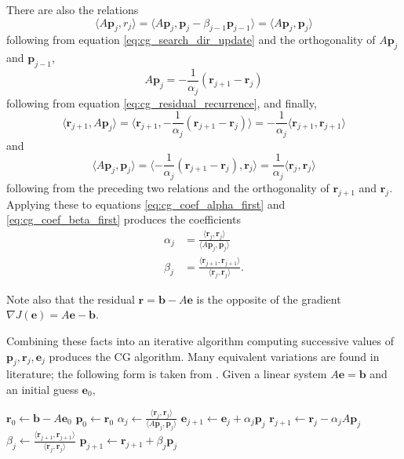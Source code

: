 \documentclass[utf8,english]{gradu3}
\begin{document}
There are also the relations
\[
  \langle A\mathbf{p}_j, r_j \rangle
  = \langle A\mathbf{p}_j, \mathbf{p}_j - \beta_{j-1} \mathbf{p}_{j-1} \rangle
  = \langle A\mathbf{p}_j, \mathbf{p}_j \rangle
\]
following from equation \eqref{eq:cg_search_dir_update}
and the orthogonality of $A\mathbf{p}_j$ and $\mathbf{p}_{j-1}$,
\[
  A\mathbf{p}_j = -\frac{1}{\alpha_j}(\mathbf{r}_{j+1} - \mathbf{r}_j)
\]
following from equation \eqref{eq:cg_residual_recurrence},
and finally,
\[
  \langle \mathbf{r}_{j+1}, A\mathbf{p}_j \rangle
  = \langle \mathbf{r}_{j+1}, -\frac{1}{\alpha_j}(\mathbf{r}_{j+1} - \mathbf{r}_j) \rangle
  = -\frac{1}{\alpha_j} \langle \mathbf{r}_{j+1}, \mathbf{r}_{j+1} \rangle
\]
and
\[
  \langle A\mathbf{p}_j, \mathbf{p}_j \rangle 
  = \langle -\frac{1}{\alpha_j}(\mathbf{r}_{j+1} - \mathbf{r}_j), \mathbf{r}_j \rangle
  = \frac{1}{\alpha_j} \langle \mathbf{r}_j, \mathbf{r}_j \rangle
\]
following from the preceding two relations and the orthogonality of
$\mathbf{r}_{j+1}$ and $\mathbf{r}_j$.
Applying these to equations \eqref{eq:cg_coef_alpha_first}
and \eqref{eq:cg_coef_beta_first} produces the coefficients
\begin{align}
  \label{eq:cg_coef_alpha_final}
  \alpha_j &= \frac{\langle \mathbf{r}_j, \mathbf{r}_j \rangle}
    {\langle A\mathbf{p}_j, \mathbf{p}_j\rangle} \\
  \label{eq:cg_coef_beta_final}
  \beta_j &= \frac{\langle \mathbf{r}_{j+1}, \mathbf{r}_{j+1} \rangle}
    {\langle \mathbf{r}_j, \mathbf{r}_j \rangle}.
\end{align}

Note also that the residual $\mathbf{r} = \mathbf{b} - A\mathbf{e}$
is the opposite of the gradient $\nabla J(\mathbf{e}) = A\mathbf{e} - \mathbf{b}$.

Combining these facts into an iterative algorithm
computing successive values of $\mathbf{p}_j,\mathbf{r}_j,\mathbf{e}_j$ produces the CG algorithm.
Many equivalent variations are found in literature;
the following form is taken from \parencite{saad_iterative_2003}.
Given a linear system $A\mathbf{e} = \mathbf{b}$ and an initial guess $\mathbf{e}_0$,

\begin{algorithmic}[1]
  \State $\mathbf{r}_0 \gets \mathbf{b} - A\mathbf{e}_0$ 
  \State $\mathbf{p}_0 \gets \mathbf{r}_0$ 
    \State $\alpha_j \gets \frac{\langle \mathbf{r}_j, \mathbf{r}_j \rangle}
        {\langle A\mathbf{p}_j, \mathbf{p}_j\rangle}$
    \State $\mathbf{e}_{j+1} \gets \mathbf{e}_j + \alpha_j \mathbf{p}_j$
    \State $\mathbf{r}_{j+1} \gets \mathbf{r}_j - \alpha_j A\mathbf{p}_j$
    \State $\beta_j \gets \frac{\langle \mathbf{r}_{j+1}, \mathbf{r}_{j+1} \rangle}
        {\langle \mathbf{r}_j, \mathbf{r}_j \rangle}$
    \State $\mathbf{p}_{j+1} \gets \mathbf{r}_{j+1} + \beta_j \mathbf{p}_j$
  \EndFor
\end{algorithmic}
\end{document}
